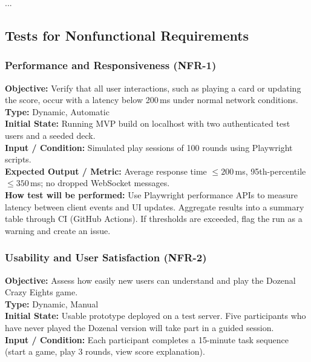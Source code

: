 \documentclass[12pt, titlepage]{article}
\begin{document}
...

\subsection{Tests for Nonfunctional Requirements}

    \subsubsection{Performance and Responsiveness (NFR-1)}
    \textbf{Objective:} Verify that all user interactions, such as playing a card or updating the score, occur with a latency below 200\,ms under normal network conditions. \\

    \textbf{Type:} Dynamic, Automatic \\

    \textbf{Initial State:} Running MVP build on localhost with two authenticated test users and a seeded deck. \\

    \textbf{Input / Condition:} Simulated play sessions of 100 rounds using Playwright scripts. \\

    \textbf{Expected Output / Metric:} Average response time $\leq 200$\,ms, 95th-percentile $\leq 350$\,ms; no dropped WebSocket messages. \\

    \textbf{How test will be performed:}
    Use Playwright performance APIs to measure latency between client events and UI updates. Aggregate results into a summary table through CI (GitHub Actions).
    If thresholds are exceeded, flag the run as a warning and create an issue.

    \subsubsection{Usability and User Satisfaction (NFR-2)}
    \textbf{Objective:} Assess how easily new users can understand and play the Dozenal Crazy Eights game. \\

    \textbf{Type:} Dynamic, Manual \\

    \textbf{Initial State:} Usable prototype deployed on a test server. Five participants who have never played the Dozenal version will take part in a guided session. \\

    \textbf{Input / Condition:} Each participant completes a 15-minute task sequence (start a game, play 3 rounds, view score explanation). \\
\end{document}
